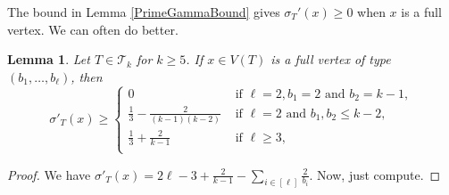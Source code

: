 \documentclass[12pt]{article}
\theoremstyle{plain}
\newtheorem{lem}[thm]{Lemma}
\theoremstyle{definition}
\theoremstyle{remark}
\newcommand{\fancy}[1]{\mathcal{#1}}
\newcommand{\T}{\fancy{T}}
\newcommand{\irange}[1]{\left[#1\right]}
\begin{document}
The bound in Lemma \ref{PrimeGammaBound} gives $\sigma_T'(x) \ge 0$ when $x$ is a full vertex.  We can often do better.

\begin{lem}\label{BetterFull}
	Let $T \in \T_k$ for $k \ge 5$.  If $x \in V(T)$ is a full vertex of type $(b_1, \ldots, b_\ell)$, then
	\[\sigma'_T(x) \ge \begin{cases}
	0 & \text{ if } \ell = 2, b_1 = 2 \text{ and } b_2 = k-1,\\
	\frac13 - \frac{2}{(k-1)(k-2)} & \text{ if } \ell = 2 \text{ and } b_1, b_2 \le k-2,\\
	\frac13 + \frac{2}{k-1} & \text{ if } \ell \ge 3,\\
	\end{cases}\]
\end{lem}
\begin{proof}
	We have $\sigma'_T(x) = 2\ell - 3 + \frac{2}{k-1} - \sum_{i \in \irange{\ell}} \frac{2}{b_i}$.  Now, just compute.
\end{proof}
\end{document}
